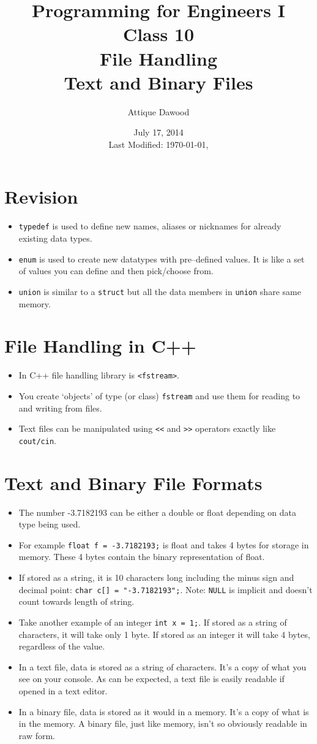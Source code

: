 \documentclass[12pt,a4paper]{article}
\title{\vspace{-2cm}Programming for Engineers I\\Class 10\\File Handling\\Text and Binary Files}
\author{Attique Dawood}
\date{July 17, 2014\\[0.2cm] Last Modified: \today, \currenttime}
\begin{document}
\maketitle
\section{Revision}
\begin{itemize}
\item \verb|typedef| is used to define new names, aliases or nicknames for already existing data types.
\item \verb|enum| is used to create new datatypes with pre--defined values. It is like a set of values you can define and then pick/choose from.
\item \verb|union| is similar to a \verb|struct| but all the data members in \verb|union| share same memory.
\end{itemize}
\section{File Handling in C++}
\begin{itemize}
\item In C++ file handling library is \verb|<fstream>|.
\item You create `objects' of type (or class) \verb|fstream| and use them for reading to and writing from files.
\item Text files can be manipulated using \verb|<<| and \verb|>>| operators exactly like \verb|cout/cin|.
\end{itemize}
\section{Text and Binary File Formats}
\begin{itemize}
\item The number -3.7182193 can be either a double or float depending on data type being used.
\item For example \verb|float f = -3.7182193;| is float and takes 4 bytes for storage in memory. These 4 bytes contain the binary representation of float.
\item If stored as a string, it is 10 characters long including the minus sign and decimal point: \verb|char c[] = "-3.7182193";|. Note: \verb|NULL| is implicit and doesn't count towards length of string.
\item Take another example of an integer \verb|int x = 1;|. If stored as a string of characters, it will take only 1 byte. If stored as an integer it will take 4 bytes, regardless of the value.
\item In a text file, data is stored as a string of characters. It's a copy of what you see on your console. As can be expected, a text file is easily readable if opened in a text editor.
\item In a binary file, data is stored as it would in a memory. It's a copy of what is in the memory. A binary file, just like memory, isn't so obviously readable in raw form.
\end{itemize}
\end{document}
